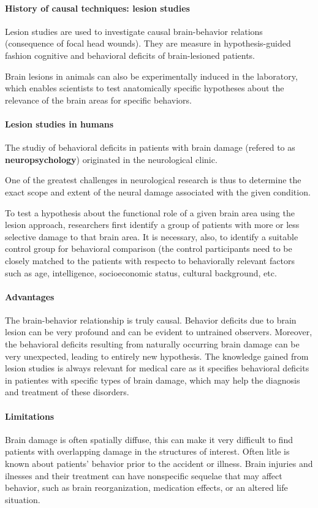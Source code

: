 \documentclass[12pt,article,oneside,a4paper]{memoir}
\begin{document}
\paragraph{History of causal techniques: lesion studies }
Lesion studies are used to investigate causal brain-behavior relations
(consequence of focal head wounds). They are measure in hypothesis-guided fashion
cognitive and behavioral deficits of brain-lesioned patients.

Brain lesions in animals can also be experimentally induced in the laboratory, 
which enables scientists to test anatomically specific hypotheses about the
relevance of the brain areas for specific behaviors.

\paragraph{Lesion studies in humans} The studiy of behavioral deficits in 
patients with brain damage (refered to as \textbf{neuropsychology}) originated
in the neurological clinic.

One of the greatest challenges in neurological research is thus to determine
the exact scope and extent of the neural damage associated with the given condition.

To test a hypothesis about the functional role of a given brain area using
the lesion approach, researchers first identify a group of patients with more
or less selective damage to that brain area. It is necessary, also, to identify
a suitable control group for behavioral comparison (the control participants
need to be closely matched to the patients with respecto to behaviorally
relevant factors such as age, intelligence, socioeconomic status, cultural
background, etc.

\paragraph{Advantages}
The brain-behavior relationship is truly causal. Behavior deficits due to brain
lesion can be very profound and can be evident to untrained observers. Moreover,
the behavioral deficits resulting from naturally occurring brain damage can be
very unexpected, leading to entirely new hypothesis. The knowledge gained from
lesion studies is always relevant for medical care as it specifies behavioral
deficits in patientes with specific types of brain damage, which may help the
diagnosis and treatment of these disorders.

\paragraph{Limitations}
Brain damage is often spatially diffuse, this can make it very difficult to find
patients with overlapping damage in the structures of interest. Often litle is
known about patients' behavior prior to the accident or illness. Brain injuries
and ilnesses and their treatment can have nonspecific sequelae that may affect
behavior, such as brain reorganization, medication effects, or an altered life
situation.
\end{document}
